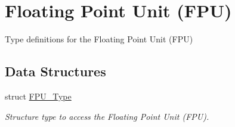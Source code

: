 \hypertarget{group___c_m_s_i_s___f_p_u}{}\section{Floating Point Unit (F\+PU)}
\label{group___c_m_s_i_s___f_p_u}


Type definitions for the Floating Point Unit (F\+PU)  


\subsection*{Data Structures}
\begin{DoxyCompactItemize}
\item 
struct \mbox{\hyperlink{struct_f_p_u___type}{F\+P\+U\+\_\+\+Type}}
\begin{DoxyCompactList}\small\item\em Structure type to access the Floating Point Unit (F\+PU). \end{DoxyCompactList}\end{DoxyCompactItemize}
